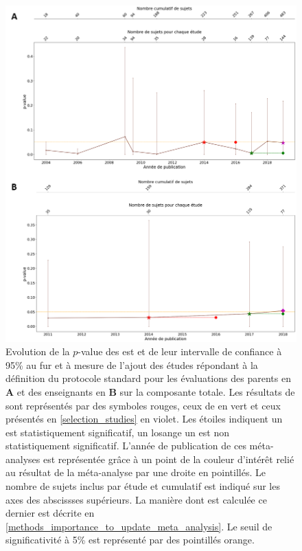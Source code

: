 \begin{figure}[h!]
  \centering
	\includegraphics[width=1\linewidth]{figures/chapter-2/meta-analysis-evolution-pvalue-std} 
  \caption[Evolution de la $p$-value des  au fur et à mesure de l'ajout de nouvelles études suivant un protocole standard.]{Evolution de la $p$-value 
	des \gls{est} et de leur intervalle de confiance à 95\% au fur et à mesure de l'ajout des études répondant à la définition du protocole standard pour les évaluations des 
	parents en \textbf{A} et des enseignants en \textbf{B} sur la composante totale.
  Les résultats de \citep{Cortese2016} sont représentés par des symboles rouges, ceux de \citet{Bussalb2019clinical} en vert et ceux présentés en \ref{selection_studies} en violet. Les étoiles 
	indiquent un \gls{est} statistiquement significatif, un losange un \gls{est} non statistiquement significatif. L'année de publication de ces méta-analyses est représentée grâce à un point de la couleur 
	d'intérêt relié au résultat de la méta-analyse par une droite en pointillés.
	Le nombre de sujets inclus par étude et cumulatif est indiqué sur les axes des abscissses supérieurs. La manière dont est calculée ce dernier est 
	décrite en \ref{methods_importance_to_update_meta_analysis}.
	Le seuil de significativité à 5\% est représenté par des pointillés orange.}
  \label{Figure:meta_analysis_evolution_pvalue_std}
\end{figure}

